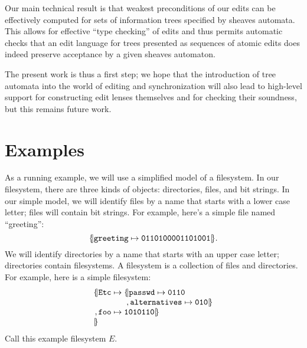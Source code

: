Our main technical result is that weakest preconditions of our edits
can be effectively computed for sets of information trees specified by
sheaves automata. This allows for effective ``type checking'' of edits
and thus permits automatic checks that an edit language for trees
presented as sequences of atomic edits does indeed preserve acceptance by a
given sheaves automaton.

The present work is thus a first step; we hope that the introduction
of tree automata into the world of editing and synchronization will
also lead to high-level support for constructing edit lenses
themselves and for checking their soundness, but this remains future
work.

\section{Examples}
\label{sec:examples}

As a running example, we will use a simplified model of a filesystem. In our
filesystem, there are three kinds of objects: directories, files, and
bit strings. In our simple model, we will identify files by a name that
starts with a lower case letter; files will contain bit strings. For
example, here's a simple file named ``greeting'':
\[\{\hspace{-2pt}|\mathtt{greeting}\mapsto\mathtt{0110100001101001}|\hspace{-2pt}\}.\]
We will identify directories by a name that starts with an upper case letter;
directories contain filesystems. A filesystem is a collection of files and
directories. For example, here is a simple filesystem:
\[
\begin{array}{c@{}r@{\;}l@{\;}l}
    \Open&\Label{Etc} &\To&\Open\Label{passwd}\To\Label{0110} \\
         &            &   &\;,  \Label{alternatives}\To\Label{010}\Close \\
    ,    &\Label{foo} &\To&\Label{1010110}\Close \\
    \Close
\end{array}
\]
Call this example filesystem $E$.

